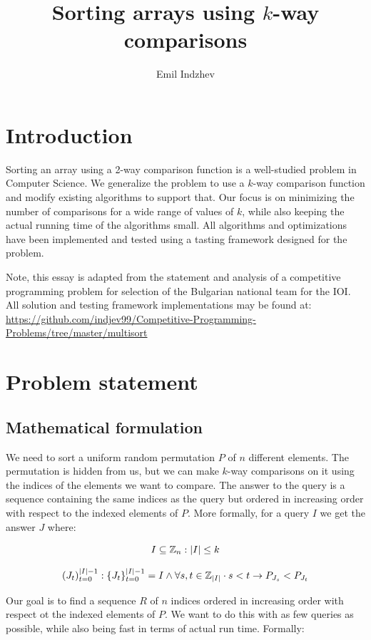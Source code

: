 \documentclass{article}
\title{Sorting arrays using $k$-way comparisons}
\author{Emil Indzhev}
\DeclarePairedDelimiter{\set}{\{}{\}}
\DeclarePairedDelimiter{\abs}{\lvert}{\rvert}
\begin{document}
\maketitle

\section{Introduction}

Sorting an array using a 2-way comparison function is a well-studied problem in Computer Science. We generalize the problem to use a $k$-way comparison function and modify existing algorithms to support that. Our focus is on minimizing the number of comparisons for a wide range of values of $k$, while also keeping the actual running time of the algorithms small. All algorithms and optimizations have been implemented and tested using a tasting framework designed for the problem.

Note, this essay is adapted from the statement and analysis of a competitive programming problem for selection of the Bulgarian national team for the IOI. All solution and testing framework implementations may be found at: \\
\url{https://github.com/indjev99/Competitive-Programming-Problems/tree/master/multisort}

\section{Problem statement}

\subsection{Mathematical formulation}

We need to sort a uniform random permutation $ P $ of $ n $ different elements. The permutation is hidden from us, but we can make $k$-way comparisons on it using the indices of the elements we want to compare. The answer to the query is a sequence containing the same indices as the query but ordered in increasing order with respect to the indexed elements of $ P $. More formally, for a query $ I $ we get the answer $ J $ where:

$$ I \subseteq \mathbb{Z}_n : \abs{I} \leq k $$

$$ (J_t)_{t=0}^{\abs{I} - 1}  : \set{J_t}_{t=0}^{\abs{I} - 1} = I \land \forall s,t \in \mathbb{Z}_{\abs{I}} \cdot s < t \rightarrow P_{J_s} < P_{J_t} $$

Our goal is to find a sequence $ R $ of $ n $ indices ordered in increasing order with respect ot the indexed elements of $ P $. We want to do this with as few queries as possible, while also being fast in terms of actual run time. Formally:
\end{document}

